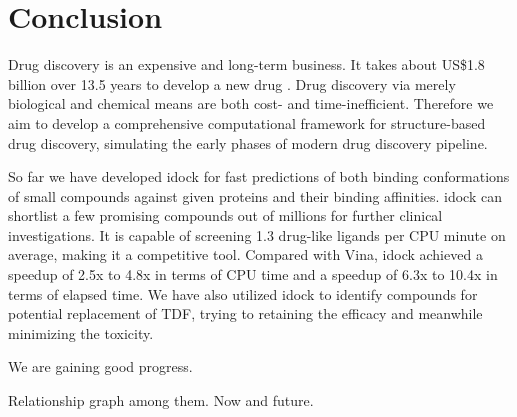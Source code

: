 \chapter{Conclusion}

Drug discovery is an expensive and long-term business. It takes about US\$1.8 billion over 13.5 years to develop a new drug \citep{716}. Drug discovery via merely biological and chemical means are both cost- and time-inefficient. Therefore we aim to develop a comprehensive computational framework for structure-based drug discovery, simulating the early phases of modern drug discovery pipeline.

So far we have developed idock for fast predictions of both binding conformations of small compounds against given proteins and their binding affinities. idock can shortlist a few promising compounds out of millions for further clinical investigations. It is capable of screening 1.3 drug-like ligands per CPU minute on average, making it a competitive tool. Compared with Vina, idock achieved a speedup of 2.5x to 4.8x in terms of CPU time and a speedup of 6.3x to 10.4x in terms of elapsed time. We have also utilized idock to identify compounds for potential replacement of TDF, trying to retaining the efficacy and meanwhile minimizing the toxicity.

We are gaining good progress.

Relationship graph among them. Now and future.

\chapterend
